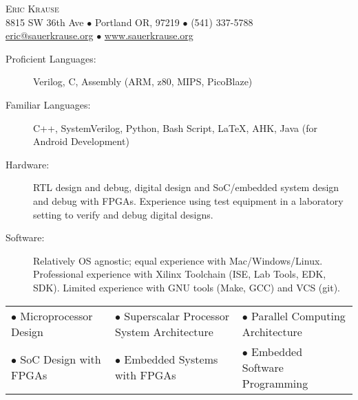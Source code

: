 \documentclass{article}
\begin{document}
\thispagestyle{firststyle} %
\small

\vspace*{-.5in} %

\begin{center}
	{\LARGE \scshape {Eric Krause}}	\\
	8815 SW 36th Ave $\bullet$ Portland OR, 97219  $\bullet$ (541) 337-5788\\
	\url{eric@sauerkrause.org}  $\bullet$  \url{www.sauerkrause.org}\\
\end{center}



	\vspace{-15pt}
	\begin{description}
		\item[Proficient Languages:] Verilog, C, Assembly (ARM, z80, MIPS, PicoBlaze)
		\item[Familiar Languages:] C++, SystemVerilog, Python, Bash Script, \LaTeX, AHK, Java (for Android Development)
		\item[Hardware:] RTL design and debug, digital design and SoC/embedded system design and debug with FPGAs. Experience using test equipment in a laboratory setting to verify and debug digital designs.
		\item[Software:] Relatively OS agnostic; equal experience with Mac/Windows/Linux.  Professional experience with Xilinx Toolchain (ISE, Lab Tools, EDK, SDK).  Limited experience with GNU tools (Make, GCC) and VCS (git).
	\end{description}
	\vspace{-4pt}

	\begin{table}[h!]
		\small
		\vspace{-19pt}
	\begin{tabular}{lll}
	$\bullet$ Microprocessor Design & $\bullet$ Superscalar Processor System Architecture & $\bullet$ Parallel Computing Architecture\\
	$\bullet$ SoC Design with FPGAs & $\bullet$ Embedded Systems with FPGAs & $\bullet$ Embedded Software Programming\\
	\end{tabular}
	\vspace{-19pt}
\end{table}	
\end{document}

